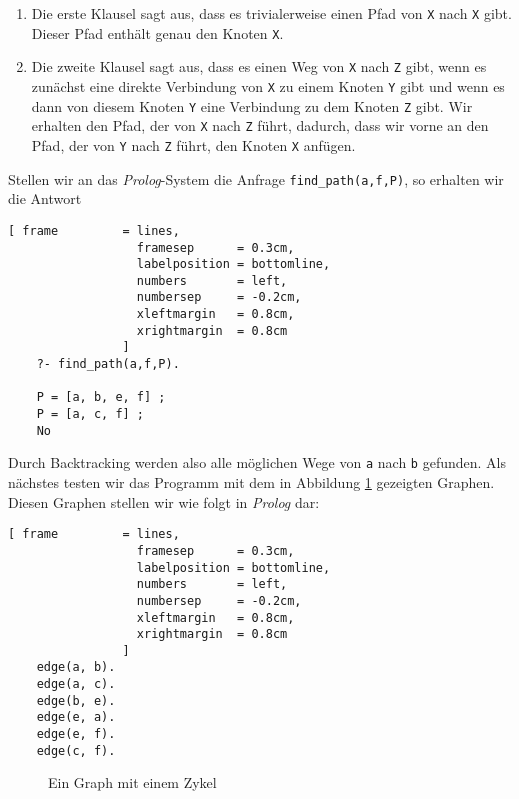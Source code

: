 \begin{enumerate}
\item Die erste Klausel sagt aus, dass es trivialerweise einen Pfad von \texttt{X} nach
      \texttt{X} gibt.  Dieser Pfad enth\"{a}lt genau den Knoten \texttt{X}.
\item Die zweite Klausel sagt aus, dass es einen Weg von \texttt{X} nach \texttt{Z}
      gibt, wenn es zun\"{a}chst eine direkte Verbindung von \texttt{X} zu einem Knoten
      \texttt{Y} gibt und wenn es dann von diesem Knoten \texttt{Y} eine Verbindung
      zu dem Knoten \texttt{Z} gibt.  Wir erhalten den Pfad, der von \texttt{X} nach
      \texttt{Z} f\"{u}hrt, dadurch, dass wir vorne an den Pfad, der von \texttt{Y} nach \texttt{Z}
      f\"{u}hrt, den Knoten \texttt{X} anf\"{u}gen.
\end{enumerate}
Stellen wir an das \textsl{Prolog}-System die Anfrage \texttt{find\_path(a,f,P)}, so
erhalten wir die Antwort
\begin{Verbatim}[ frame         = lines, 
                  framesep      = 0.3cm, 
                  labelposition = bottomline,
                  numbers       = left,
                  numbersep     = -0.2cm,
                  xleftmargin   = 0.8cm,
                  xrightmargin  = 0.8cm
                ]
    ?- find_path(a,f,P).
 
    P = [a, b, e, f] ;   
    P = [a, c, f] ;
    No
\end{Verbatim}
Durch Backtracking werden also alle m\"{o}glichen Wege von \texttt{a} nach \texttt{b} gefunden.
Als n\"{a}chstes testen wir das Programm mit dem in Abbildung \ref{fig:graph2} gezeigten
Graphen.  Diesen Graphen stellen wir wie folgt in \textsl{Prolog} dar:
\begin{Verbatim}[ frame         = lines, 
                  framesep      = 0.3cm, 
                  labelposition = bottomline,
                  numbers       = left,
                  numbersep     = -0.2cm,
                  xleftmargin   = 0.8cm,
                  xrightmargin  = 0.8cm
                ]
    edge(a, b).
    edge(a, c).
    edge(b, e).
    edge(e, a).
    edge(e, f).
    edge(c, f).
\end{Verbatim}

\begin{figure}[!h]
  \centering
  \caption{Ein Graph mit einem Zykel}
  \label{fig:graph2}
\end{figure}

